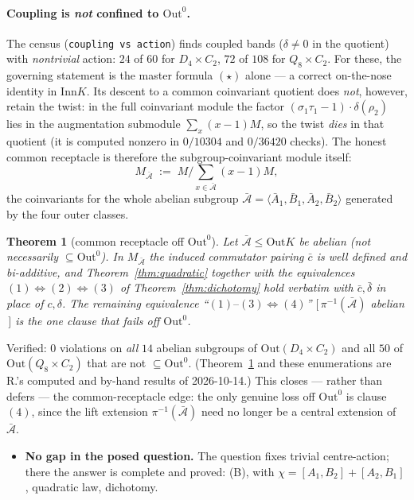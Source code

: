 \documentclass[11pt]{article}
\newtheorem{theorem}{Theorem}
\theoremstyle{definition}
\newcommand{\Inn}{\mathrm{Inn}}
\newcommand{\Out}{\mathrm{Out}}
\newcommand{\Ab}{\bar{\mathcal{A}}}
\begin{document}
\paragraph{Coupling is \emph{not} confined to $\Out^0$.}
The census (\texttt{coupling vs action}) finds coupled bands ($\delta\neq0$ in the
quotient) with \emph{nontrivial} action: $24$ of $60$ for $D_4\times C_2$, $72$ of $108$
for $Q_8\times C_2$. For these, the governing statement is the master formula $(\star)$
alone --- a correct on-the-nose identity in $\Inn K$. Its descent to a common
coinvariant quotient does \emph{not}, however, retain the twist: in the full
coinvariant module the factor $(\sigma_1\tau_1-1)\!\cdot\!\delta(\rho_2)$ lies in the
augmentation submodule $\sum_x(x-1)M$, so the twist \emph{dies} in that quotient (it is
computed nonzero in $0/10304$ and $0/36420$ checks). The honest common receptacle is
therefore the subgroup-coinvariant module itself:
\[
M_{\Ab}\;:=\;M\Big/\textstyle\sum_{x\in\Ab}(x-1)M,
\]
the coinvariants for the whole abelian subgroup $\Ab=\langle\bar A_1,\bar B_1,\bar A_2,
\bar B_2\rangle$ generated by the four outer classes.

\begin{theorem}[common receptacle off $\Out^0$]\label{thm:receptacle}
Let $\Ab\le\Out K$ be abelian (not necessarily $\subseteq\Out^0$). In $M_{\Ab}$ the
induced commutator pairing $\bar c$ is well defined and bi-additive, and
Theorem~\ref{thm:quadratic} together with the equivalences
$(1)\Leftrightarrow(2)\Leftrightarrow(3)$ of Theorem~\ref{thm:dichotomy} hold
\emph{verbatim} with $\bar c,\bar\delta$ in place of $c,\delta$. The remaining
equivalence ``$(1)\text{--}(3)\Leftrightarrow(4)$'' $[\,\pi^{-1}(\Ab)$ abelian$\,]$ is
the one clause that \emph{fails} off $\Out^0$.
\end{theorem}

\noindent Verified: $0$ violations on \emph{all} $14$ abelian subgroups of
$\Out(D_4\times C_2)$ and all $50$ of $\Out(Q_8\times C_2)$ that are not
$\subseteq\Out^0$. (Theorem~\ref{thm:receptacle} and these enumerations are R.'s
computed and by-hand results of 2026-10-14.) This closes --- rather than defers --- the common-receptacle edge: the
only genuine loss off $\Out^0$ is clause $(4)$, since the lift extension
$\pi^{-1}(\Ab)$ need no longer be a central extension of $\Ab$.
\begin{itemize}
\item \textbf{No gap in the posed question.} The question fixes trivial centre-action;
there the answer is complete and proved: (B), with $\chi=[A_1,B_2]+[A_2,B_1]$, quadratic
law, dichotomy.
\end{itemize}
\end{document}
